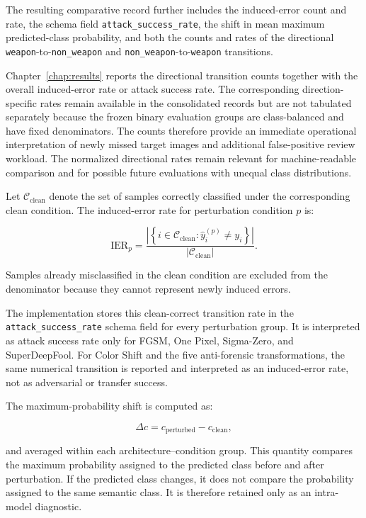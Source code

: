The resulting comparative record further includes the induced-error count and
rate, the schema field \texttt{attack\_success\_rate}, the shift in mean
maximum predicted-class probability, and both the counts and rates of the
directional
\texttt{weapon}-to-\texttt{non\_weapon} and
\texttt{non\_weapon}-to-\texttt{weapon} transitions.

Chapter~\ref{chap:results} reports the directional transition counts together
with the overall induced-error rate or attack success rate. The corresponding
direction-specific rates remain available in the consolidated records but are
not tabulated separately because the frozen binary evaluation groups are
class-balanced and have fixed denominators. The counts therefore provide an
immediate operational interpretation of newly missed target images and
additional false-positive review workload. The normalized directional rates
remain relevant for machine-readable comparison and for possible future
evaluations with unequal class distributions.

Let \(\mathcal{C}_{\mathrm{clean}}\) denote the set of samples correctly
classified under the corresponding clean condition. The induced-error rate for
perturbation condition \(p\) is:

\begin{equation}
\mathrm{IER}_{p}
=
\frac{
\left|
\left\{
i \in \mathcal{C}_{\mathrm{clean}}
:
\hat{y}^{(p)}_{i} \neq y_{i}
\right\}
\right|
}{
\left|
\mathcal{C}_{\mathrm{clean}}
\right|
}.
\end{equation}

Samples already misclassified in the clean condition are excluded from the
denominator because they cannot represent newly induced errors.

The implementation stores this clean-correct transition rate in the
\texttt{attack\_success\_rate} schema field for every perturbation group. It is
interpreted as attack success rate only for FGSM, One Pixel, Sigma-Zero, and
SuperDeepFool. For Color Shift and the five anti-forensic transformations, the
same numerical transition is reported and interpreted as an induced-error rate,
not as adversarial or transfer success.

The maximum-probability shift is computed as:

\begin{equation}
\Delta c
=
c_{\mathrm{perturbed}}
-
c_{\mathrm{clean}},
\end{equation}

and averaged within each architecture--condition group. This quantity compares
the maximum probability assigned to the predicted class before and after
perturbation. If the predicted class changes, it does not compare the
probability assigned to the same semantic class. It is therefore retained only
as an intra-model diagnostic.

